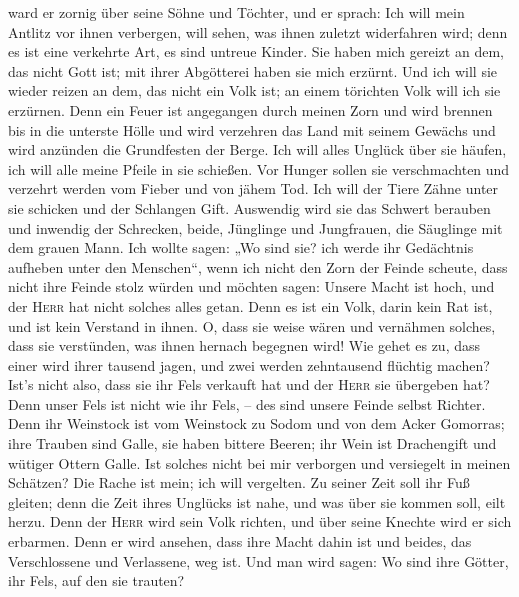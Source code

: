 ward er zornig über seine Söhne und Töchter,  und er
sprach: Ich will mein Antlitz vor ihnen verbergen, will sehen, was ihnen
zuletzt widerfahren wird; denn es ist eine verkehrte Art, es sind
untreue Kinder.  Sie haben mich gereizt an dem, das nicht
Gott ist; mit ihrer Abgötterei haben sie mich erzürnt. Und ich will sie
wieder reizen an dem, das nicht ein Volk ist; an einem törichten Volk
will ich sie erzürnen.  Denn ein Feuer ist angegangen
durch meinen Zorn und wird brennen bis in die unterste Hölle und wird
verzehren das Land mit seinem Gewächs und wird anzünden die Grundfesten
der Berge.  Ich will alles Unglück über sie häufen, ich
will alle meine Pfeile in sie schießen.  Vor Hunger
sollen sie verschmachten und verzehrt werden vom Fieber und von jähem
Tod. Ich will der Tiere Zähne unter sie schicken und der Schlangen Gift.
 Auswendig wird sie das Schwert berauben und inwendig der
Schrecken, beide, Jünglinge und Jungfrauen, die Säuglinge mit dem grauen
Mann.  Ich wollte sagen: „Wo sind sie? ich werde ihr
Gedächtnis aufheben unter den Menschen``,  wenn ich nicht
den Zorn der Feinde scheute, dass nicht ihre Feinde stolz würden und
möchten sagen: Unsere Macht ist hoch, und der \textsc{Herr} hat nicht
solches alles getan.  Denn es ist ein Volk, darin kein
Rat ist, und ist kein Verstand in ihnen.  O, dass sie
weise wären und vernähmen solches, dass sie verstünden, was ihnen
hernach begegnen wird!  Wie gehet es zu, dass einer wird
ihrer tausend jagen, und zwei werden zehntausend flüchtig machen? Ist's
nicht also, dass sie ihr Fels verkauft hat und der \textsc{Herr} sie
übergeben hat?  Denn unser Fels ist nicht wie ihr Fels,
-- des sind unsere Feinde selbst Richter.  Denn ihr
Weinstock ist vom Weinstock zu Sodom und von dem Acker Gomorras; ihre
Trauben sind Galle, sie haben bittere Beeren;  ihr Wein
ist Drachengift und wütiger Ottern Galle.  Ist solches
nicht bei mir verborgen und versiegelt in meinen Schätzen?
 Die Rache ist mein; ich will vergelten. Zu seiner Zeit
soll ihr Fuß gleiten; denn die Zeit ihres Unglücks ist nahe, und was
über sie kommen soll, eilt herzu.  Denn der \textsc{Herr}
wird sein Volk richten, und über seine Knechte wird er sich erbarmen.
Denn er wird ansehen, dass ihre Macht dahin ist und beides, das
Verschlossene und Verlassene, weg ist.  Und man wird
sagen: Wo sind ihre Götter, ihr Fels, auf den sie trauten?
